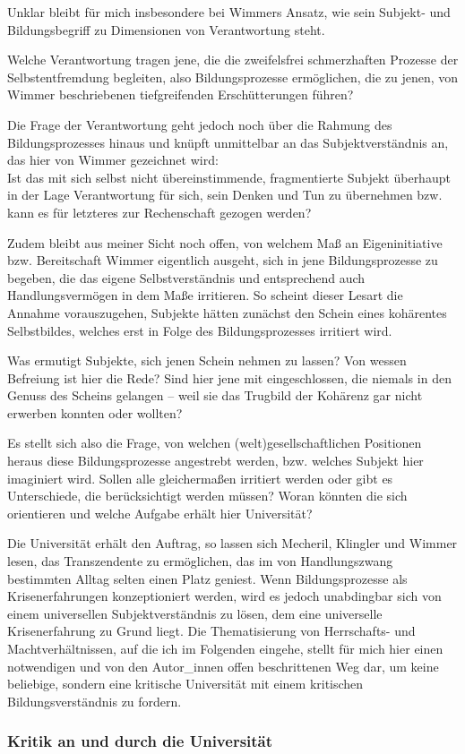 \documentclass[11pt]{article}
\begin{document}
Unklar bleibt für mich insbesondere bei Wimmers Ansatz, wie sein
Subjekt- und Bildungsbegriff zu Dimensionen von Verantwortung steht.

Welche
Verantwortung tragen jene, die die zweifelsfrei schmerzhaften Prozesse der
Selbstentfremdung begleiten, also Bildungsprozesse ermöglichen, die zu jenen,
von Wimmer beschriebenen tiefgreifenden Erschütterungen führen?

Die Frage der
Verantwortung geht jedoch noch über die Rahmung des Bildungsprozesses hinaus
und knüpft unmittelbar an das Subjektverständnis an, das hier von Wimmer
gezeichnet wird:\\
Ist das mit sich selbst nicht übereinstimmende, fragmentierte
Subjekt überhaupt in der Lage Verantwortung für sich, sein Denken und Tun zu
übernehmen bzw. kann es für letzteres zur Rechenschaft gezogen werden?

Zudem
bleibt aus meiner Sicht noch offen, von welchem Maß an Eigeninitiative bzw.
Bereitschaft Wimmer eigentlich ausgeht, sich in jene Bildungsprozesse zu
begeben, die das eigene Selbstverständnis und entsprechend auch
Handlungsvermögen in dem Maße irritieren. So scheint dieser Lesart die Annahme
vorauszugehen, Subjekte hätten zunächst den Schein eines kohärentes
Selbstbildes, welches erst in Folge des Bildungsprozesses irritiert wird.

Was
ermutigt Subjekte, sich jenen Schein nehmen zu lassen? Von wessen Befreiung ist
hier die Rede? Sind hier jene mit eingeschlossen, die niemals in den Genuss des
Scheins gelangen – weil sie das Trugbild der Kohärenz gar nicht erwerben
konnten oder wollten?

Es stellt sich also die Frage, von welchen
(welt)gesellschaftlichen Positionen heraus diese Bildungsprozesse angestrebt
werden, bzw. welches Subjekt hier imaginiert wird. Sollen alle gleichermaßen
irritiert werden oder gibt es Unterschiede, die berücksichtigt werden müssen?
Woran könnten die sich orientieren und welche Aufgabe erhält hier Universität?

Die Universität erhält den Auftrag, so lassen sich Mecheril, Klingler und
Wimmer lesen, das Transzendente zu ermöglichen, das im von Handlungszwang
bestimmten Alltag selten einen Platz geniest. Wenn Bildungsprozesse als
Krisenerfahrungen konzeptioniert werden, wird es jedoch unabdingbar sich von
einem universellen Subjektverständnis zu lösen, dem eine universelle
Krisenerfahrung zu Grund liegt. Die Thematisierung von Herrschafts- und
Machtverhältnissen, auf die ich im Folgenden eingehe, stellt für mich hier
einen notwendigen und von den Autor\_innen offen beschrittenen Weg dar, um
keine beliebige, sondern eine kritische Universität mit einem kritischen
Bildungsverständnis zu fordern.

\subsubsection{Kritik an und durch die Universität}
\end{document}
